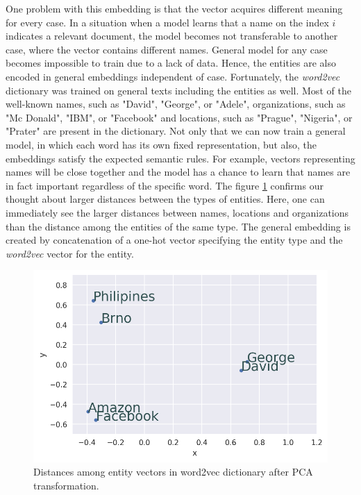 \documentclass[
  digital, %
  notable,   %
  nolof,     %
  nolot,     %
]{fithesis3}
\begin{document}
One problem with this embedding is that the vector acquires different meaning for every case.
In a situation when a model learns that a name on the index $i$ indicates a relevant document, the model becomes not transferable to another case, where the vector contains different names.
General model for any case becomes impossible to train due to a lack of data.
Hence, the entities are also encoded in general embeddings independent of case.
Fortunately, the \textit{word2vec} dictionary was trained on general texts including the entities as well.
Most of the well-known names, such as "David", "George", or "Adele", organizations, such as "Mc Donald", "IBM", or "Facebook" and locations, such as "Prague", "Nigeria", or "Prater" are present in the dictionary.
Not only that we can now train a general model, in which each word has its own fixed representation, but also, the embeddings satisfy the expected semantic rules.
For example, vectors representing names will be close together and the model has a chance to learn that names are in fact important regardless of the specific word.
The figure \ref{fig:entity_distances} confirms our thought about larger distances between the types of entities.
Here, one can immediately see the larger distances between names, locations and organizations than the distance among the entities of the same type.
The general embedding is created by concatenation of a one-hot vector specifying the entity type and the \textit{word2vec} vector for the entity.

\begin{figure}[h]
\centering
\caption{Distances among entity vectors in word2vec dictionary after PCA transformation.}
\label{fig:entity_distances}
\includegraphics[width=\textwidth]{img/entities_distances}
\end{figure}
\end{document}
